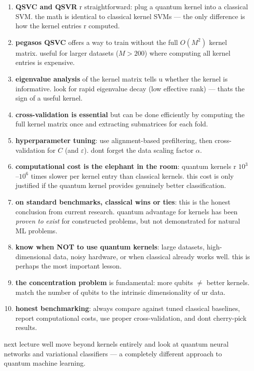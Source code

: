 \documentclass[11pt,a4paper]{article}
\theoremstyle{definition}
\theoremstyle{remark}
\begin{document}
\begin{enumerate}[leftmargin=*]
    \item \textbf{QSVC and QSVR} r straightforward: plug a quantum kernel into a classical SVM. the math is identical to classical kernel SVMs --- the only difference is how the kernel entries r computed.

    \item \textbf{pegasos QSVC} offers a way to train without the full $O(M^2)$ kernel matrix. useful for larger datasets ($M > 200$) where computing all kernel entries is expensive.

    \item \textbf{eigenvalue analysis} of the kernel matrix tells u whether the kernel is informative. look for rapid eigenvalue decay (low effective rank) --- thats the sign of a useful kernel.

    \item \textbf{cross-validation is essential} but can be done efficiently by computing the full kernel matrix once and extracting submatrices for each fold.

    \item \textbf{hyperparameter tuning}: use alignment-based prefiltering, then cross-validation for $C$ (and $\varepsilon$). dont forget the data scaling factor $\alpha$.

    \item \textbf{computational cost is the elephant in the room}: quantum kernels r $10^3$--$10^6$ times slower per kernel entry than classical kernels. this cost is only justified if the quantum kernel provides genuinely better classification.

    \item \textbf{on standard benchmarks, classical wins or ties}: this is the honest conclusion from current research. quantum advantage for kernels has been \emph{proven to exist} for constructed problems, but not demonstrated for natural ML problems.

    \item \textbf{know when NOT to use quantum kernels}: large datasets, high-dimensional data, noisy hardware, or when classical already works well. this is perhaps the most important lesson.

    \item \textbf{the concentration problem} is fundamental: more qubits $\neq$ better kernels. match the number of qubits to the intrinsic dimensionality of ur data.

    \item \textbf{honest benchmarking}: always compare against tuned classical baselines, report computational costs, use proper cross-validation, and dont cherry-pick results.
\end{enumerate}

next lecture well move beyond kernels entirely and look at quantum neural networks and variational classifiers --- a completely different approach to quantum machine learning.
\end{document}
